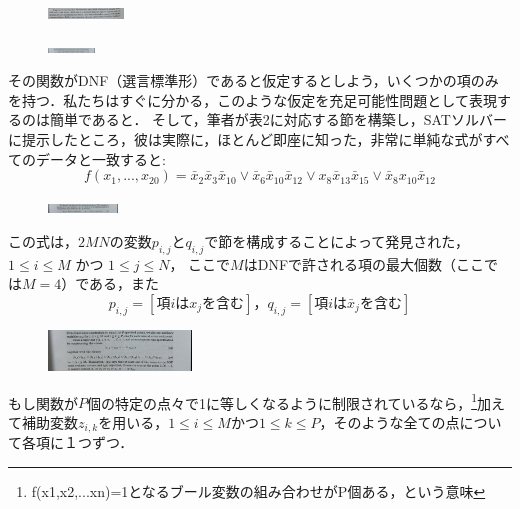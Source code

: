 \documentclass[dvipdfmx,a4paper,12pt]{jsarticle}
\begin{document}
\newpage
\begin{figure}[htbp]
  \centering
  \includegraphics[width=20mm,angle=270]{images/2.jpg}
\end{figure}
\begin{figure}[htbp]
  \centering
  \includegraphics[width=12.5mm,angle=270]{images/3.jpg}
\end{figure}
その関数がDNF（選言標準形）であると仮定するとしよう，いくつかの項のみを持つ．私たちはすぐに分かる，このような仮定を充足可能性問題として表現するのは簡単であると．
そして，筆者が表2に対応する節を構築し，SATソルバーに提示したところ，彼は実際に，ほとんど即座に知った，非常に単純な式がすべてのデータと一致すると:
\setcounter{equation}{26}
\begin{equation}
f(x_{1},...,x_{20}) = \bar{x}_{2}\bar{x}_{3}\bar{x}_{10}\lor\bar{x}_{6}\bar{x}_{10}\bar{x}_{12}\lor x_{8}\bar{x}_{13}\bar{x}_{15}\lor \bar{x}_{8}x_{10}\bar{x}_{12} 
\end{equation}  
\begin{figure}[htbp]
  \centering
  \includegraphics[width=18.5mm,angle=270]{images/2-2.jpg}
\end{figure}

この式は，$2MN$の変数$p_{i,j}$と$q_{i,j}$で節を構成することによって発見された，
$1 \le i \le M$ かつ $1 \le j \le N$，
ここで$M$はDNFで許される項の最大個数（ここでは$M = 4$）である，また
\begin{equation}
p_{i,j} = [ 項iはx_{j}を含む]，q_{i,j} = [ 項iは\bar{x}_{j}を含む] 
\end{equation}
\clearpage
\begin{figure}[htbp]
  \centering
  \includegraphics[width=38mm,angle=270]{images/2-3.jpg}
\end{figure}
もし関数が$P$個の特定の点々で1に等しくなるように制限されているなら，\footnote{f(x1,x2,...xn)=1となるブール変数の組み合わせがP個ある，という意味}加えて補助変数$z_{i,k}$を用いる，$1 \le i \le M$かつ$1 \le k \le P$，そのような全ての点について各項に１つずつ．
\end{document}
